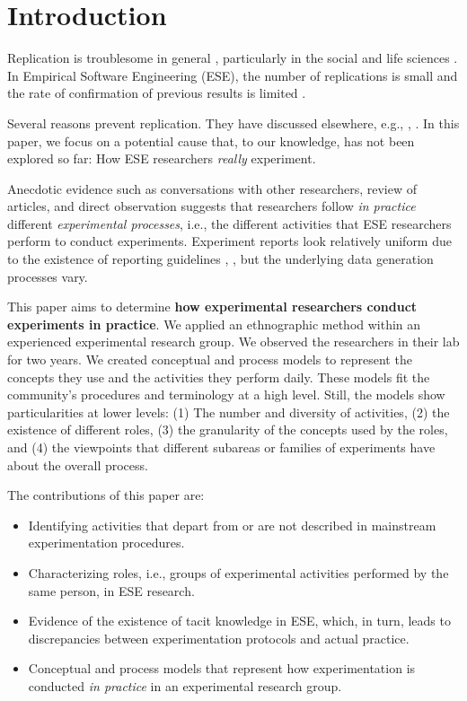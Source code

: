 \section{Introduction}\label{sec-introduction}
Replication is troublesome in general \cite{Klein-2018-many}, particularly in the social and life sciences \cite{Pashler-2012-perspectives} \cite{Baker-2016-lid-reproducibility}. In Empirical Software Engineering (ESE), the number of replications is small \cite{Bezerra-2015-Replication-SE-U-SMS} and the rate of confirmation of previous results is limited \cite{Jorgensen-2016-Incorrects-Results-SEE}.

Several reasons prevent replication. They have discussed elsewhere, e.g., \cite{Miller-2005-replicating-SE-experiments}, \cite{Demagalhaes-2015-replications-SE}. In this paper, we focus on a potential cause that, to our knowledge, has not been explored so far: How ESE researchers \textit{really} experiment. 

Anecdotic evidence such as conversations with other researchers, review of articles, and direct observation suggests that researchers follow \textit{in practice} different \textit{experimental processes}, i.e., the different activities that ESE researchers perform to conduct experiments. Experiment reports look relatively uniform due to the existence of reporting guidelines \cite{Carver-2010-guidelines-replication-SE}, \cite{Jedlitschka-2008-reporting-experiments-SE}, but the underlying data generation processes vary.

This paper aims to determine \textbf{how experimental researchers conduct experiments in practice}. We applied an ethnographic method \cite{Sharp-2016-Ethnographic-Studies-ESE} within an experienced experimental research group. We observed the researchers in their lab for two years. We created conceptual and process models to represent the concepts they use and the activities they perform daily. These models fit the community's procedures and terminology at a high level. Still, the models show particularities at lower levels: (1) The number and diversity of activities, (2) the existence of different roles, (3) the granularity of the concepts used by the roles, and (4) the viewpoints that different subareas or families of experiments have about the overall process.

The contributions of this paper are:

\begin{itemize}
  \item Identifying activities that depart from or are not described in mainstream experimentation procedures. 
  \item Characterizing roles, i.e., groups of experimental activities performed by the same person, in ESE research.
  \item Evidence of the existence of tacit knowledge in ESE, which, in turn, leads to discrepancies between experimentation protocols and actual practice.
  \item Conceptual and process models that represent how experimentation is conducted \textit{in practice} in an experimental research group.
\end{itemize}

